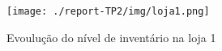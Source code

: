\begin{figure}[<+htpb+>]
	\centering
	\texttt{[image: ./report-TP2/img/loja1.png]}
	\caption{Evoulução do nível de inventário na loja 1}
\label{fig:figure2}
\end{figure}
